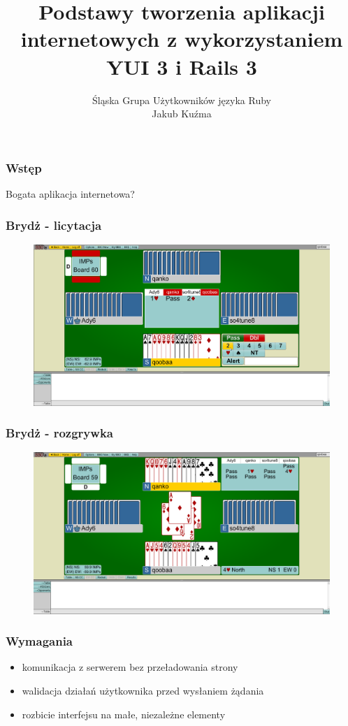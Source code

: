 \documentclass[16pt]{beamer}
\author{Śląska Grupa Użytkowników języka Ruby\\
  \footnotesize{Jakub Kuźma}}
\title{Podstawy tworzenia aplikacji internetowych z wykorzystaniem YUI 3 i Rails 3}
\begin{document}
\frame{\titlepage}

\begin{frame}
  \frametitle{Wstęp}
  \begin{center}
    Bogata aplikacja internetowa?
  \end{center}
\end{frame}

\begin{frame}
  \frametitle{Brydż - licytacja}
  \begin{figure}
    \includegraphics[width=\linewidth]{bbo-auction.png}
  \end{figure}
\end{frame}

\begin{frame}
  \frametitle{Brydż - rozgrywka}
  \begin{figure}
    \includegraphics[width=\linewidth]{bbo-play.png}
  \end{figure}
\end{frame}

\begin{frame}
  \frametitle{Wymagania}
  \begin{itemize}
  \item komunikacja z serwerem bez przeładowania strony
  \item walidacja działań użytkownika przed wysłaniem żądania
  \item rozbicie interfejsu na małe, niezależne elementy
  \end{itemize}
\end{frame}
\end{document}
